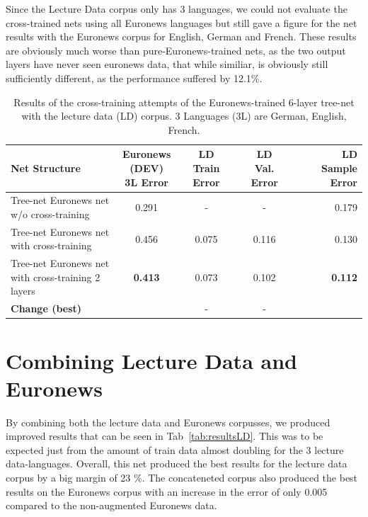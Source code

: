 Since the Lecture Data corpus only has 3 languages, we could not evaluate the cross-trained nets using all Euronews languages but still gave a figure for the net results with the Euronews corpus for English, German and French. These results are obviously much worse than pure-Euronews-trained nets, as the two output layers have never seen euronews data, that while similiar, is obviously still sufficiently different, as the performance suffered by 12.1\%.


\begin{table}
\caption{Results of the cross-training attempts of the Euronews-trained 6-layer tree-net with the lecture data (LD) corpus. 3 Languages (3L) are German, English, French.}
\label{tab:LIDFine}
\begin{tabular}{| l | c | c | c | r | }
	\hline
	\textbf{Net Structure} & \parbox[t]{2cm}{\textbf{Euronews} \\ \textbf{(DEV)} \\ \textbf{3L Error}} &  \parbox[t]{2.3cm}{\textbf{LD} \\ \textbf{Train} \textbf{Error}} &  \parbox[t]{2cm}{\textbf{LD} \\ \textbf{Val. Error}} &  \parbox[t]{2.5cm}{\textbf{LD} \\ \textbf{Sample Error}}  \\
	\hline
	\parbox[t]{4.2cm}{Tree-net Euronews net \\
	 w/o cross-training}  & 0.291 & - & - & 0.179 \\
	\hline
	\parbox[t]{4.2cm}{Tree-net Euronews net \\ with cross-training } & 0.456 & 0.075 & 0.116 & 0.130 \\
	\hdashline
	\parbox[t]{4.2cm}{Tree-net Euronews net \\ with cross-training 2 layers } & \textbf{0.413} & 0.073 & 0.102 & \textbf{0.112} \\
	\hline
	\textbf{Change (best)} &  & - & - &  \\
	\hline
\end{tabular}
\end{table}


\section{Combining Lecture Data and Euronews}
\label{sec:LIDNetworkConcat}
By combining both the lecture data and Euronews corpusses, we produced improved results that can be seen in Tab~\ref{tab:resultsLD}. This was to be expected just from the amount of train data almost doubling for the 3 lecture data-languages. Overall, this net produced the best results for the lecture data corpus by a big margin of 23 \%. The concateneted corpus also produced the best results on the Euronews corpus with an increase in the error of only 0.005 compared to the non-augmented Euronews data. 

